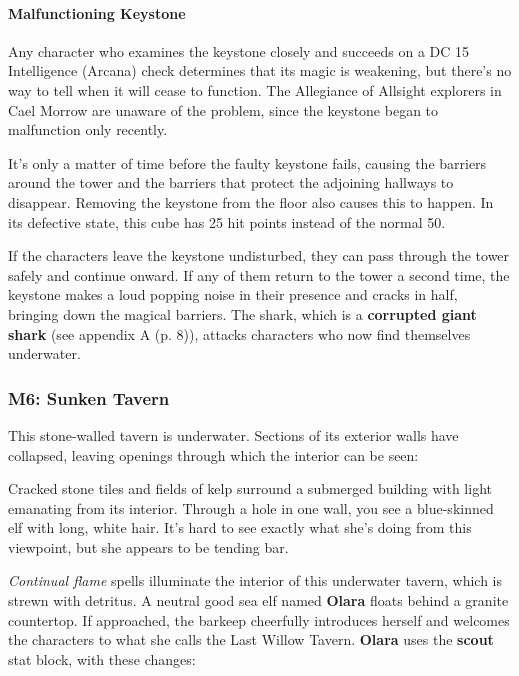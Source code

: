 \documentclass[letterpaper, 11pt, bg=full, twocolumn]{dndbook}
\begin{document}
\paragraph{Malfunctioning Keystone}

Any character who examines the keystone closely and succeeds on a DC 15 Intelligence (Arcana) check determines that its magic is weakening, but there's no way to tell when it will cease to function. The Allegiance of Allsight explorers in Cael Morrow are unaware of the problem, since the keystone began to malfunction only recently.

It's only a matter of time before the faulty keystone fails, causing the barriers around the tower and the barriers that protect the adjoining hallways to disappear. Removing the keystone from the floor also causes this to happen. In its defective state, this cube has 25 hit points instead of the normal 50.

If the characters leave the keystone undisturbed, they can pass through the tower safely and continue onward. If any of them return to the tower a second time, the keystone makes a loud popping noise in their presence and cracks in half, bringing down the magical barriers. The shark, which is a \textbf{corrupted giant shark} (see appendix A (p. 8)), attacks characters who now find themselves underwater.

\subsubsection{M6: Sunken Tavern}

This stone-walled tavern is underwater. Sections of its exterior walls have collapsed, leaving openings through which the interior can be seen:

\begin{DndReadAloud}
Cracked stone tiles and fields of kelp surround a submerged building with light emanating from its interior. Through a hole in one wall, you see a blue-skinned elf with long, white hair. It's hard to see exactly what she's doing from this viewpoint, but she appears to be tending bar.
\end{DndReadAloud}

\textit{Continual flame} spells illuminate the interior of this underwater tavern, which is strewn with detritus. A neutral good sea elf named \textbf{Olara} floats behind a granite countertop. If approached, the barkeep cheerfully introduces herself and welcomes the characters to what she calls the Last Willow Tavern. \textbf{Olara} uses the \textbf{scout} stat block, with these changes:
\end{document}
